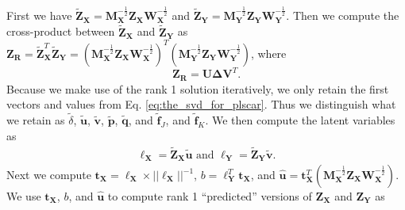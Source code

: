 \documentclass[12pt]{article}
\begin{document}
First we have
\(\widetilde{{\mathbf Z}}_{\mathbf X} = {\mathbf M}_{\mathbf X}^{-\frac{1}{2}}{\mathbf Z}_{\mathbf X}{\mathbf W}_{\mathbf X}^{-\frac{1}{2}}\)
and
\(\widetilde{{\mathbf Z}}_{\mathbf Y} = {\mathbf M}_{\mathbf Y}^{-\frac{1}{2}}{\mathbf Z}_{\mathbf Y}{\mathbf W}_{\mathbf Y}^{-\frac{1}{2}}\).
Then we compute the cross-product between
\(\widetilde{\mathbf Z}_{\mathbf X}\) and
\(\widetilde{\mathbf Z}_{\mathbf Y}\) as
\({\mathbf Z}_{\mathbf R} = \widetilde{\mathbf Z}_{\mathbf X}^{T}\widetilde{\mathbf Z}_{\mathbf Y} = ({\mathbf M}_{\mathbf X}^{-\frac{1}{2}}{\mathbf Z}_{\mathbf X}{\mathbf W}_{\mathbf X}^{-\frac{1}{2}})^{T}({\mathbf M}_{\mathbf Y}^{-\frac{1}{2}}{\mathbf Z}_{\mathbf Y}{\mathbf W}_{\mathbf Y}^{-\frac{1}{2}})\),
where \begin{equation}
{\mathbf Z}_{\mathbf R} = {\mathbf U} {\boldsymbol \Delta} {\mathbf V}^{T}.
\label{eq:the_svd_for_plscar}
\end{equation} Because we make use of the rank 1 solution iteratively,
we only retain the first vectors and values from Eq.
\ref{eq:the_svd_for_plscar}. Thus we distinguish what we retain as
\(\tilde\delta\), \(\widetilde{\mathbf u}\), \(\widetilde{\mathbf v}\),
\(\widetilde{\mathbf p}\), \(\widetilde{\mathbf q}\), and
\(\widetilde{\mathbf f}_{J}\), and \(\widetilde{\mathbf f}_{K}\). We
then compute the latent variables as \begin{equation}
\begin{aligned}
{\boldsymbol \ell}_{\mathbf X} = \widetilde{\mathbf Z}_{\mathbf X}\widetilde{\mathbf u} \text{ and } {\boldsymbol \ell}_{\mathbf Y} = \widetilde{\mathbf Z}_{\mathbf Y}\widetilde{\mathbf v}.
\label{eq:lvs}
\end{aligned}
\end{equation} Next we compute
\({\mathbf t}_{\mathbf X} = {\boldsymbol \ell}_{\mathbf X} \times {{\lvert\lvert {\boldsymbol \ell}_{\mathbf X} \rvert\rvert}^{-1}}\),
\(b = {\boldsymbol \ell}_{\mathbf Y}^{T}{\mathbf t}_{\mathbf X}\), and
\(\widehat{\mathbf u} = {\mathbf t}_{\mathbf X}^{T} ({\mathbf M}_{\mathbf X}^{-\frac{1}{2}}{\mathbf Z}_{\mathbf X}{\mathbf W}_{\mathbf X}^{-\frac{1}{2}})\).
We use \({\mathbf t}_{\mathbf X}\), \(b\), and \(\widehat{\mathbf u}\)
to compute rank 1 ``predicted'' versions of \({\mathbf Z}_{\mathbf X}\)
and \({\mathbf Z}_{\mathbf Y}\) as
\end{document}
